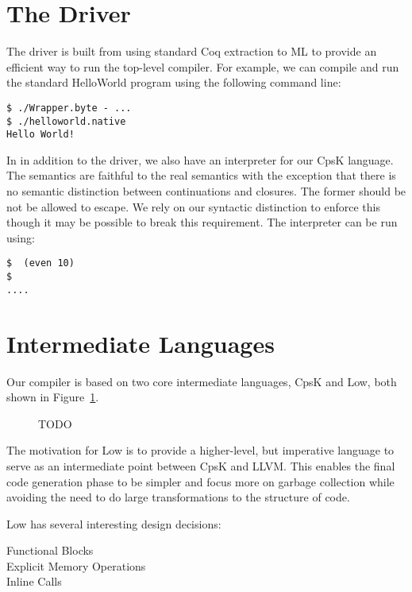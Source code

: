\documentclass{article}
\begin{document}
\section{The Driver}
\label{sec:driver}

The driver is built from using standard Coq extraction to ML to provide an efficient way to run the top-level compiler. For example, we can compile and run the standard HelloWorld program using the following command line:

\begin{verbatim}
$ ./Wrapper.byte - ...
$ ./helloworld.native
Hello World!
\end{verbatim}

In in addition to the driver, we also have an interpreter for our CpsK language. The semantics are faithful to the real semantics with the exception that there is no semantic distinction between continuations and closures. The former should be not be allowed to escape. We rely on our syntactic distinction to enforce this though it may be possible to break this requirement. The interpreter can be run using:

\begin{verbatim}
$  (even 10)
$
....
\end{verbatim}

\section{Intermediate Languages}
\label{sec:il}

Our compiler is based on two core intermediate languages, CpsK and Low, both shown in Figure~\ref{fig:cpsk-low}.
\begin{figure}

TODO

\caption{}
\label{fig:cpsk-low}
\end{figure}

The motivation for Low is to provide a higher-level, but imperative language to serve as an intermediate point between CpsK and LLVM. This enables the final code generation phase to be simpler and focus more on garbage collection while avoiding the need to do large transformations to the structure of code.

Low has several interesting design decisions:
\begin{description}
\item[Functional Blocks]
\item[Explicit Memory Operations]
\item[Inline Calls]
\end{description}
\end{document}
